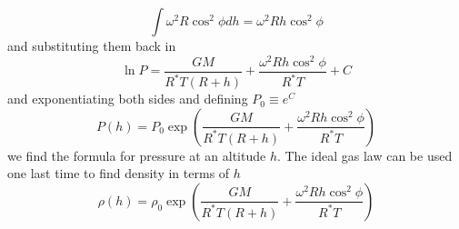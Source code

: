 \documentclass[12pt]{article}
\newcommand{\om}{\omega}
\begin{document}
\begin{equation*}
\int \om^2R\cos^2\phi dh =  \om^2Rh\cos^2\phi
\end{equation*}
and substituting them back in
\begin{equation*}
    \ln{P} = \frac{GM}{R^*T\left(R+h\right)} + \frac{\om^2Rh\cos^2\phi}{R^*T} + C
\end{equation*}
and exponentiating both sides and defining $P_0 \equiv e^C$
\begin{equation}
P\left(h\right) = P_0 \exp\left(\frac{GM}{R^*T\left(R+h\right)} + \frac{\om^2Rh\cos^2\phi}{R^*T}\right)
\end{equation}
we find the formula for pressure at an altitude $h$. The ideal gas law can be used one last time to find density in terms of $h$
\begin{equation}
\rho\left(h\right) = \rho_0 \exp\left(\frac{GM}{R^*T\left(R+h\right)} + \frac{\om^2Rh\cos^2\phi}{R^*T}\right)
\end{equation}
\end{document}
